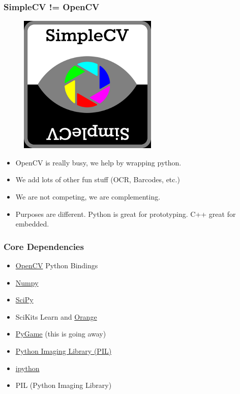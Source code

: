 \documentclass{beamer}
\begin{document}

\begin{frame}
\frametitle{SimpleCV != OpenCV }
\begin{figure}
  \includegraphics[width=0.2\linewidth]{simplecv.png}
\end{figure}
\begin{itemize}
  \item OpenCV is really busy, we help by wrapping python.
  \item We add lots of other fun stuff (OCR, Barcodes, etc.)
  \item We are not competing, we are complementing. 
  \item Purposes are different. Python is great for prototyping. C++ great for embedded.
\end{itemize}
\end{frame}


\begin{frame}
  \frametitle{Core Dependencies}
  \begin{itemize}
  \item \href{http://www.opencv.org}{OpenCV} Python Bindings
  \item \href{http://docs.scipy.org/doc/}{Numpy}
  \item \href{http://docs.scipy.org/doc/}{SciPy}
  \item SciKits Learn and \href{http://orange.biolab.si/}{Orange}
  \item \href{http://www.pygame.org}{PyGame} (this is going away)
  \item \href{http://www.pythonware.com/products/pil/}{Python Imaging Library (PIL)}
  \item \href{http://ipython.org/}{ipython}
  \item PIL (Python Imaging Library)
  \end{itemize}
\end{frame}

\end{document}

